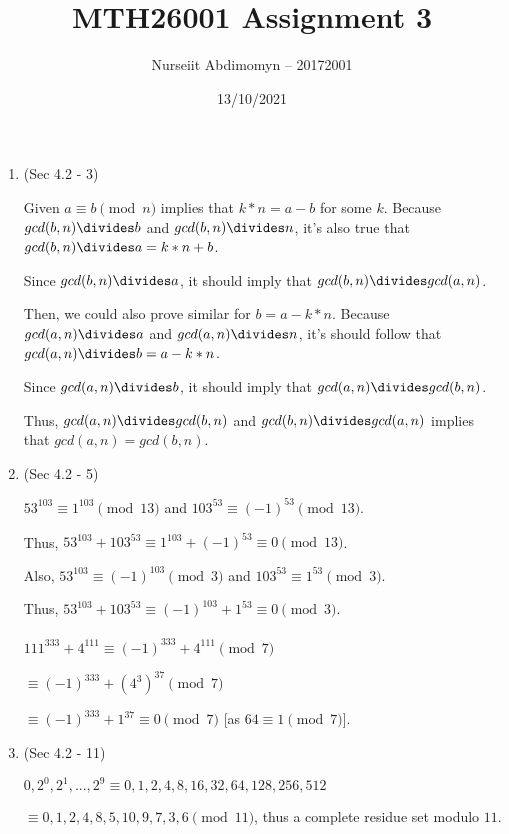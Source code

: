 \documentclass[12pt]{article}
\title{MTH26001 Assignment 3}
\author{Nurseiit Abdimomyn -- 20172001}
\date{13/10/2021}
\begin{document}
\maketitle

\begin{enumerate}
  \item
    (Sec 4.2 - 3)
    
    Given $a \equiv b \pmod n$ implies that $k*n = a - b$ for some $k$.
    Because $gcd(b, n) \divides b$ and $gcd(b, n) \divides n$, it's also
    true that $gcd(b, n) \divides a = k*n + b$.

    Since $gcd(b, n) \divides a$, it should imply that $gcd(b, n) \divides gcd(a, n)$.

    Then, we could also prove similar for $b = a - k*n$. Because $gcd(a, n) \divides a$ and $gcd(a, n) \divides n$, it's should
    follow that $gcd(a, n) \divides b = a - k*n$.

    Since $gcd(a, n) \divides b$, it should imply that $gcd(a, n) \divides gcd(b, n)$.

    Thus, $gcd(a, n) \divides gcd(b, n)$ and $gcd(b, n) \divides gcd(a, n)$ implies that $gcd(a, n) = gcd(b, n)$.

  \item
    (Sec 4.2 - 5)

    $53^{103} \equiv 1^{103} \pmod 13$ and $103^{53} \equiv (-1)^{53} \pmod {13}$.

    Thus, $53^{103} + 103^{53} \equiv 1^{103} + (-1)^{53} \equiv 0 \pmod {13}$.

    Also, $53^{103} \equiv (-1)^{103} \pmod 3$ and $103^{53} \equiv 1^{53} \pmod 3$.

    Thus, $53^{103} + 103^{53} \equiv (-1)^{103} + 1^{53} \equiv 0 \pmod 3$. \\ \\

    $111^{333} + 4^{111} \equiv (-1)^{333} + 4^{111} \pmod 7$

    $\equiv (-1)^{333} + (4^3)^{37} \pmod 7$

    $\equiv (-1)^{333} + 1^{37} \equiv 0 \pmod 7$ [as $64 \equiv 1 \pmod 7$].

  \item
    (Sec 4.2 - 11)

    ${0, 2^0, 2^1, ..., 2^9} \equiv {0, 1, 2, 4, 8, 16, 32, 64, 128, 256, 512}$
    
    $\equiv {0, 1, 2, 4, 8, 5, 10, 9, 7, 3, 6} \pmod{11}$, thus a complete residue set modulo $11$. \\ \\


\end{enumerate}
\end{document}
